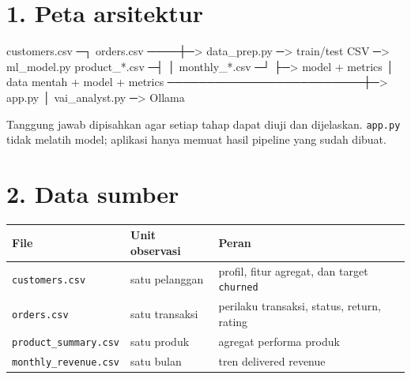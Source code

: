 \documentclass[
  indonesian,
  letterpaper,
  DIV=11,
  numbers=noendperiod]{scrreprt}
\newenvironment{Shaded}{\begin{snugshade}}{\end{snugshade}}
\newcommand{\NormalTok}[1]{\textcolor[rgb]{0.00,0.23,0.31}{#1}}
\newcounter{none} %
\begin{document}
\section{1. Peta arsitektur}\label{peta-arsitektur}

\begin{Shaded}
\begin{Highlighting}[]
\NormalTok{customers.csv ─┐}
\NormalTok{orders.csv ────┼─\textgreater{} data\_prep.py ─\textgreater{} train/test CSV ─\textgreater{} ml\_model.py}
\NormalTok{product\_*.csv ─┤                                      │}
\NormalTok{monthly\_*.csv ─┘                                      ├─\textgreater{} model + metrics}
\NormalTok{                                                       │}
\NormalTok{data mentah + model + metrics ─────────────────────────┼─\textgreater{} app.py}
\NormalTok{                                                       │}
\NormalTok{                                                vai\_analyst.py ─\textgreater{} Ollama}
\end{Highlighting}
\end{Shaded}

Tanggung jawab dipisahkan agar setiap tahap dapat diuji dan dijelaskan.
\texttt{app.py} tidak melatih model; aplikasi hanya memuat hasil
pipeline yang sudah dibuat.

\section{2. Data sumber}\label{data-sumber}

{\def\LTcaptype{none} %
\begin{longtable}[]{@{}
  >{\raggedright\arraybackslash}p{}
  >{\raggedright\arraybackslash}p{}
  >{\raggedright\arraybackslash}p{}@{}}
\toprule\noalign{}
\begin{minipage}[b]{\linewidth}\raggedright
File
\end{minipage} & \begin{minipage}[b]{\linewidth}\raggedright
Unit observasi
\end{minipage} & \begin{minipage}[b]{\linewidth}\raggedright
Peran
\end{minipage} \\
\midrule\noalign{}
\endhead
\bottomrule\noalign{}
\endlastfoot
\texttt{customers.csv} & satu pelanggan & profil, fitur agregat, dan
target \texttt{churned} \\
\texttt{orders.csv} & satu transaksi & perilaku transaksi, status,
return, rating \\
\texttt{product\_summary.csv} & satu produk & agregat performa produk \\
\texttt{monthly\_revenue.csv} & satu bulan & tren delivered revenue \\
\end{longtable}
}
\end{document}
